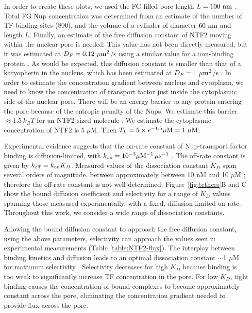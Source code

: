 In order to create these plots, we used the FG-filled pore length $L = 100\ {\rm nm}$
\cite{frenkiel-krispin10, maimon12}.  Total FG Nup concentration was determined from an estimate of the number of TF binding sites ($800$), and the volume of a cylinder of diameter $60\ \nm$ and length $L$.  Finally, an estimate of the free diffusion constant of NTF2 moving within the nuclear pore is needed.  This value has not been directly measured, but it was estimated at $D_F = 0.12 \ \mu\mathrm{m}^2$/s using a similar value for a non-binding protein \cite{ribbeck01}.  As would be expected, this diffusion constant is smaller than that of a karyopherin in the nucleus, which has been estimated at $D_F =1 \ \mu\mathrm{m}^2$/s \cite{cardarelli10}.  In order to estimate the concentration gradient between nucleus and cytoplasm, we need to know the concentration of transport factor just inside the cytoplasmic side of the nuclear pore.  There will be an energy barrier to any protein entering the pore because of the entropic penalty of the Nups.  We estimate this barrier $\approx 1.5\ k_B T$ for an NTF2 sized molecule \cite{timney16}.  We estimate the cytoplasmic concentration of NTF2 is 5 $\mu$M.  Then $T_L= 5 \times e^{-1.5} \mu \mathrm{M} = 1 \mathrm{\ \mu M}$.  

Experimental evidence suggests that the on-rate constant of Nup-transport factor binding is diffusion-limited, with $k_{\rm on} = 10^{-3}\mu \mathrm{M}^{-1} \, \mu \mathrm{s}^{-1}$ \cite{milles15, hough15}.  The off-rate constant is given by $k_{\rm off} = k_{\rm on} K_D$.  Measured values of the dissociation constant $K_D$ span several orders of magnitude, between approximately between 10 nM and 10 $\mu$M \cite{pyhtila03, gilchrist02, tetenbaum-novatt12-1,
  milles15, timney16, vovk16}; therefore the off-rate constant is not well-determined.  Figure~\ref{fig:tethers}B and C show the bound diffusion coefficient and selectivity for a range of $K_D$ values spanning those measured experimentally, with a fixed, diffusion-limited on-rate.  Throughout this work, we consider a wide range of dissociation constants.


Allowing the bound diffusion constant to approach the free diffusion constant, using the above parameters, selectivity can approach the values seen in experimental measurements (Table \ref{table:NTF2-flux}). The interplay between binding kinetics and diffusion leads to an optimal dissociation constant $\sim$1 $\mu$M for maximum selectivity . Selectivity decreases for high $K_D$ because binding is too weak to
significantly increase TF concentration in the pore.  For low $K_D$, tight binding causes the concentration of bound complexes to become approximately constant across the pore, eliminating the concentration gradient needed to provide flux across the pore.

